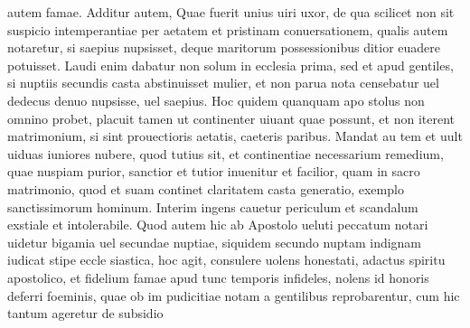 \documentclass{article}
\begin{document}
\begin{pages}
autem famae. Additur autem, Quae fuerit unius uiri uxor, de qua scilicet non sit suspicio intemperantiae per aetatem et pristinam conuersationem, qualis autem notaretur, si saepius nupsisset, deque maritorum possessionibus ditior euadere potuisset. Laudi enim dabatur non solum in ecclesia prima, sed et apud gentiles, si nuptiis secundis casta abstinuisset mulier, et non parua nota censebatur uel dedecus denuo nupsisse, uel saepius. Hoc quidem quanquam apo stolus non omnino probet, placuit tamen ut continenter uiuant quae possunt, et non iterent matrimonium, si sint prouectioris aetatis, caeteris paribus. Mandat au tem et uult uiduas iuniores nubere, quod tutius sit, et continentiae necessarium remedium, quae nuspiam purior, sanctior et tutior inuenitur et facilior, quam in sacro matrimonio, quod et suam continet claritatem casta generatio, exemplo sanctissimorum hominum. Interim ingens cauetur periculum et scandalum exstiale et intolerabile. Quod autem hic ab Apostolo ueluti peccatum notari uidetur bigamia uel secundae nuptiae, siquidem secundo nuptam indignam iudicat stipe eccle siastica, hoc agit, consulere uolens honestati, adactus spiritu apostolico, et fidelium famae apud tunc temporis infideles, nolens id honoris deferri foeminis, quae ob im pudicitiae notam a gentilibus reprobarentur, cum hic tantum ageretur de subsidio  \pend

\end{pages}
\end{document}
